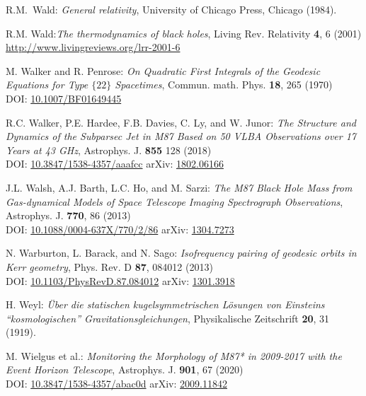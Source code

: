 \begin{thebibliography}{123}
R.M.~Wald: {\em General relativity},
University of Chicago Press, Chicago (1984).

R.M. Wald:{\em The thermodynamics of black holes},
Living Rev. Relativity {\bf 4}, 6 (2001) \\
\url{http://www.livingreviews.org/lrr-2001-6}

M. Walker and R. Penrose: {\em On Quadratic First Integrals of the Geodesic Equations
for Type $\{22\}$ Spacetimes},
Commun. math. Phys. {\bf 18}, 265 (1970)\\
DOI: \href{https://doi.org/10.1007/BF01649445}{10.1007/BF01649445}

R.C. Walker, P.E. Hardee, F.B. Davies, C. Ly, and W. Junor:
{\em The Structure and Dynamics of the Subparsec Jet in M87 Based on 50 VLBA Observations over 17 Years at 43 GHz},
Astrophys. J. {\bf 855} 128 (2018)\\
DOI: \href{https://doi.org/10.3847/1538-4357/aaafcc}{10.3847/1538-4357/aaafcc}\hfill
arXiv: \href{https://arxiv.org/abs/1802.06166}{1802.06166}

J.L. Walsh, A.J. Barth, L.C. Ho, and M. Sarzi:
{\em The M87 Black Hole Mass from Gas-dynamical Models of Space Telescope Imaging Spectrograph Observations},
Astrophys. J. {\bf 770}, 86 (2013)\\
DOI: \href{https://doi.org/10.1088/0004-637X/770/2/86}{10.1088/0004-637X/770/2/86}\hfill
arXiv: \href{https://arxiv.org/abs/1304.7273}{1304.7273}

N. Warburton, L. Barack, and N. Sago:
{\em Isofrequency pairing of geodesic orbits in Kerr geometry},
Phys. Rev. D {\bf 87}, 084012 (2013)\\
DOI: \href{https://doi.org/10.1103/PhysRevD.87.084012}{10.1103/PhysRevD.87.084012}\hfill
arXiv: \href{https://arxiv.org/abs/1301.3918}{1301.3918}

H. Weyl: {\em \"Uber die statischen kugelsymmetrischen L\"osungen von Einsteins ``kosmologischen'' Gravitationsgleichungen},
Physikalische Zeitschrift {\bf 20}, 31 (1919).

M. Wielgus et al.:
{\em Monitoring the Morphology of M87* in 2009-2017 with the Event Horizon Telescope},
Astrophys. J. {\bf 901}, 67 (2020)\\
DOI: \href{https://doi.org/10.3847/1538-4357/abac0d}{10.3847/1538-4357/abac0d}\hfill
arXiv: \href{https://arxiv.org/abs/2009.11842}{2009.11842}


\end{thebibliography}
